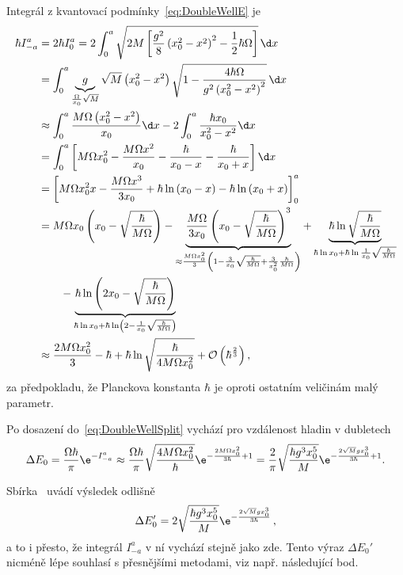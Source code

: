 \begin{solution}
\begin{enumerate}
		Integrál z kvantovací podmínky~\eqref{eq:DoubleWellE} je
		\begin{align}
			\hbar I_{-a}^{a}
				&=2\hbar I_{0}^{a}=2\int_{0}^{a}\sqrt{2M\left[\frac{g^{2}}{8}\left(x_{0}^{2}-x^{2}\right)^{2}-\frac{1}{2}\hbar\Omega\right]}\,\d x\nonumber\\
				&=\int_{0}^{a}\underbrace{g}_{\frac{\Omega}{x_{0}}\sqrt{M}}\sqrt{M}\left(x_{0}^{2}-x^{2}\right)\sqrt{1-\frac{4\hbar\Omega}{g^{2}\left(x_{0}^{2}-x^{2}\right)^{2}}}\,\d x\nonumber\\
				&\approx\int_{0}^{a}\frac{M\Omega\left(x_{0}^{2}-x^{2}\right)}{x_{0}}\d x-2\int_{0}^{a}\frac{\hbar x_{0}}{x_{0}^{2}-x^{2}}\d x\nonumber\\
				&=\int_{0}^{a}\left[M\Omega x_{0}^{2}-\frac{M\Omega x^{2}}{x_{0}}-\frac{\hbar}{x_{0}-x}-\frac{\hbar}{x_{0}+x}\right]\d x\nonumber\\
				&=\left[M\Omega x_{0}^{2}x-\frac{M\Omega x^{3}}{3x_{0}}+\hbar\ln\left(x_{0}-x\right)-\hbar\ln\left(x_{0}+x\right)\right]_{0}^{a}\nonumber\\
				&=M\Omega x_{0}\left(x_{0}-\sqrt{\frac{\hbar}{M\Omega}}\right)
					-\underbrace{\frac{M\Omega}{3x_{0}}\left(x_{0}-\sqrt{\frac{\hbar}{M\Omega}}\right)^{3}}_{\approx\frac{M\Omega x_{0}^{2}}{3}\left(1-\frac{3}{x_{0}}\sqrt{\frac{\hbar}{M\Omega}}+\frac{3}{x_{0}^{2}}\frac{\hbar}{M\Omega}\right)}
					+\underbrace{\hbar\ln{\sqrt{\frac{\hbar}{M\Omega}}}}_{\hbar\ln{x_{0}}+\hbar\ln{\frac{1}{x_{0}}\sqrt{\frac{\hbar}{M\Omega}}}}\nonumber\\
				&\qquad-\underbrace{\hbar\ln{\left(2x_{0}-\sqrt{\frac{\hbar}{M\Omega}}\right)}}_{\hbar\ln{x_{0}}+\hbar\ln\left(2-\frac{1}{x_{0}}\sqrt{\frac{\hbar}{M\Omega}}\right)}\nonumber\\
				&\approx\frac{2M\Omega x_{0}^{2}}{3}-\hbar+\hbar\ln\sqrt{\frac{\hbar}{4M\Omega x_{0}^{2}}}+\mathcal{O}\left(\hbar^{\frac{2}{3}}\right),
		\end{align}
		za předpokladu, že Planckova konstanta $\hbar$ je oproti ostatním veličinám malý parametr.
		
		Po dosazení do~\eqref{eq:DoubleWellSplit} vychází pro vzdálenost hladin v dubletech
		\begin{equation}
			\Delta E_{0}
				=\frac{\Omega\hbar}{\pi}\e^{-I_{-a}^{a}}\approx\frac{\Omega\hbar}{\pi}\sqrt{\frac{4M\Omega x_{0}^{2}}{\hbar}}\e^{-\frac{2M\Omega x_{0}^{2}}{3\hbar}+1}
				=\frac{2}{\pi}\sqrt{\frac{\hbar g^{3}x_{0}^{5}}{M}}\e^{-\frac{2\sqrt{M}g x_{0}^{3}}{3\hbar}+1}.
		\end{equation}
		\begin{note}
			Sbírka~\cite{Cini2012} uvádí výsledek odlišně
			\begin{equation}
				\Delta E_{0}'=2\sqrt{\frac{\hbar g^{3}x_{0}^{5}}{M}}\e^{-\frac{2\sqrt{M}g x_{0}^{3}}{3\hbar}}\,,
			\end{equation}
			a to i přesto, že integrál $I_{-a}^{a}$ v ní vychází stejně jako zde.
			Tento výraz $\Delta E_{0}'$ nicméně lépe souhlasí s přesnějšími metodami, viz např. následující bod.
		\end{note}
			

\end{enumerate}
\end{solution}
